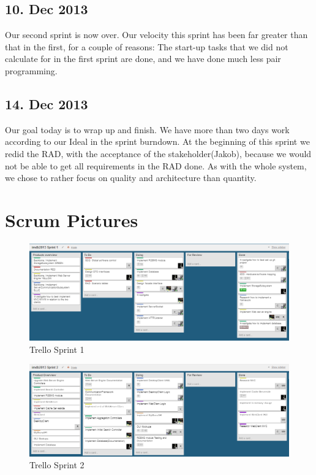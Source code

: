 \subsection{10. Dec 2013}
Our second sprint is now over. Our velocity this sprint has been far greater than that in the first, for a couple of reasons: The start-up tasks that we did not calculate for in the first sprint are done, and we have done much less pair programming.

\subsection{14. Dec 2013}
Our goal today is to wrap up and finish. We have more than two days work according to our Ideal in the sprint burndown. At the beginning of this sprint we redid the RAD, with the acceptance of the stakeholder(Jakob), because we would not be able to get all requirements in the RAD done. As with the whole system, we chose to rather focus on quality and architecture than quantity.

\section{Scrum Pictures}
\label{sec:Scrum Pictures}



\begin{figure}[h]
\begin{center}
\includegraphics[scale=0.5]{img/SCRUM/trelloSprint1.png}
\caption{Trello Sprint 1}
\label{fig:Trello Sprint 1}
\end{center}
\end{figure}

\begin{figure}[h]
\begin{center}
\includegraphics[scale=0.5]{img/SCRUM/trelloSprint2.png}
\caption{Trello Sprint 2}
\label{fig:Trello Sprint 2}
\end{center}
\end{figure}


